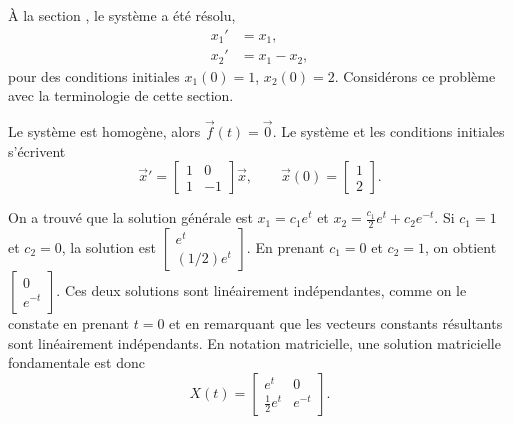 \begin{example}
À la section , le système a été résolu,
\begin{align*}
x_1' & = x_1 , \\
x_2' & = x_1 - x_2 ,
\end{align*}
pour des conditions initiales $x_1(0) = 1$, $x_2(0) = 2$.
Considérons ce problème avec la terminologie de cette section.

Le système est homogène, alors $\vec{f}(t) = \vec{0}$.
Le système et les conditions initiales s'écrivent
\begin{equation*}
{\vec{x}}'
=
\begin{bmatrix}
1 & 0 \\
1 & -1
\end{bmatrix}
\vec{x} ,
\qquad
\vec{x}(0) = 
\begin{bmatrix}
1 \\
2
\end{bmatrix} .
\end{equation*}

On a trouvé que la solution générale est
$x_1 = c_1 e^t $ et
$x_2 = \frac{c_1}{2}e^{t} + c_2e^{-t}$. 
Si $c_1=1$ et $c_2=0$, la solution est
$\left[ \begin{smallmatrix} e^t \\ (1/2) e^t \end{smallmatrix} \right]$.
En prenant $c_1=0$ et $c_2=1$, on obtient
$\left[ \begin{smallmatrix} 0 \\ e^{-t} \end{smallmatrix} \right]$.
Ces deux solutions sont linéairement indépendantes, comme on le constate en prenant
$t=0$ et en remarquant que les vecteurs constants résultants sont linéairement indépendants. En notation matricielle, une solution matricielle fondamentale est donc
\begin{equation*}
X(t) = 
\begin{bmatrix}
e^t & 0 \\
\frac{1}{2} e^t & e^{-t}
\end{bmatrix} .
\end{equation*}


\end{example}

